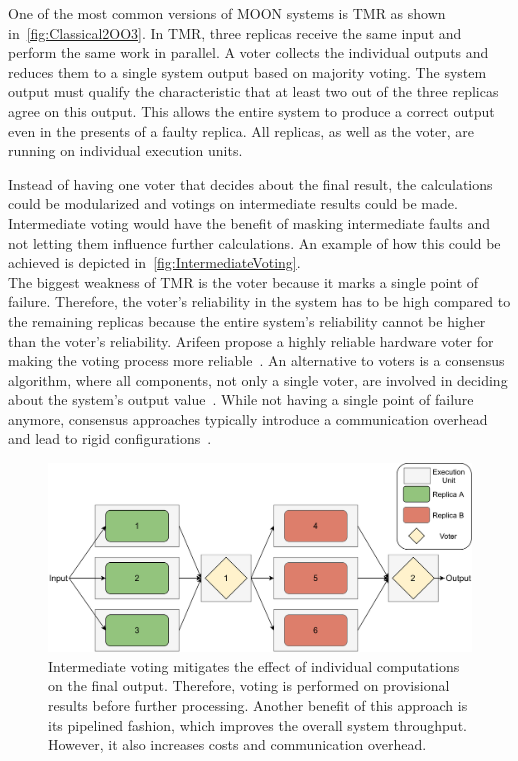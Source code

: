 One of the most common versions of \gls*{MOON} systems is \gls*{TMR} as shown in~\autoref{fig:Classical2OO3}.
In \gls*{TMR}, three replicas receive the same input and perform the same work in parallel.
A voter collects the individual outputs and reduces them to a single system output based on majority voting.
The system output must qualify the characteristic that at least two out of the three replicas agree on this output.
This allows the entire system to produce a correct output even in the presents of a faulty replica.
All replicas, as well as the voter, are running on individual execution units.

Instead of having one voter that decides about the final result, the calculations could be modularized and votings on intermediate results could be made.
Intermediate voting would have the benefit of masking intermediate faults and not letting them influence further calculations.
An example of how this could be achieved is depicted in~\autoref{fig:IntermediateVoting}.
\\

The biggest weakness of \gls*{TMR} is the voter because it marks a single point of failure.
Therefore, the voter's reliability in the system has to be high compared to the remaining replicas because the entire system's reliability cannot be higher than the voter's reliability.
Arifeen \etal propose a highly reliable hardware voter for making the voting process more reliable~\cite{ArifeenFaultTolerantTMR}.
An alternative to voters is a consensus algorithm, where all components, not only a single voter, are involved in deciding about the system's output value~\cite{lamport2001paxos}.
While not having a single point of failure anymore, consensus approaches typically introduce a communication overhead and lead to rigid configurations~\cite{GamerIncreasingMOON}.

\begin{figure}[!hb]
	\centering
	\includegraphics[width=0.9\linewidth]{images/IntermediateVoting}
	\caption{Intermediate voting mitigates the effect of individual computations on the final output. Therefore, voting is performed on provisional results before further processing. Another benefit of this approach is its pipelined fashion, which improves the overall system throughput. However, it also increases costs and communication overhead. }
	\label{fig:IntermediateVoting}
\end{figure}

